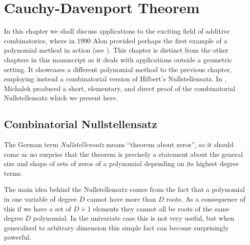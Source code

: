 \chapter{Cauchy-Davenport Theorem \label{chap:alon}}
In this chapter we shall discuss applications to the exciting field of additive combinatorics, where in 1990 Alon provided perhaps
the first example of a polynomial method in action (see \cite{alon1999combinatorial}). This chapter is distinct from the other chapters in this manuscript as it deals with applications outside a geometric setting. It showcases a different polynomial method to the previous chapter, employing instead a combinatorial version of Hilbert's Nullstellensatz.
In \cite{michalek2010}, Michalek produced a short, elementary, and direct proof of the combinatorial Nullstellensatz which we present here.
\section{Combinatorial Nullstellensatz}
The German term \textit{Nullstellensatz} means ``theorem about zeros'', so it should come as no surprise that the theorem is precisely a statement about the general size and shape of sets of zeros of a polynomial depending on its highest degree terms. 

The main idea behind the Nullstellensatz comes from the fact that a polynomial in one variable of degree $D$ cannot have more than $D$ roots. As a consequence of this if we have a set of $D+1$ elements they cannot all be roots of the same degree $D$ polynomial. In the univariate case this is not very useful, but when generalised to arbitrary dimension this simple fact can become surprisingly powerful. 

